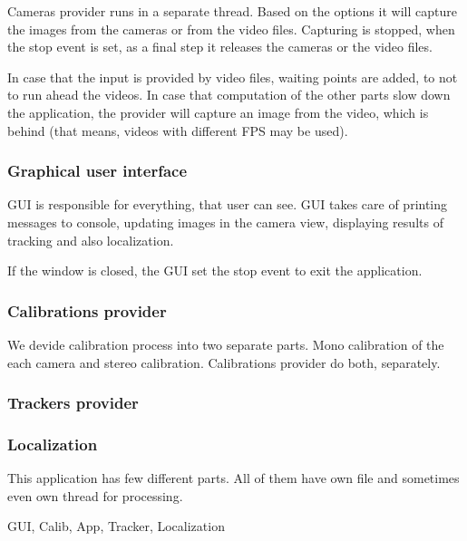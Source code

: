 Cameras provider runs in a separate thread. Based on the options it will
capture the images from the cameras or from the video files. Capturing is
stopped, when the stop event is set, as a final step it releases the cameras or
the video files.

In case that the input is provided by video files, waiting points are added, to
not to run ahead the videos. In case that computation of the other parts slow
down the application, the provider will capture an image from the video, which
is behind (that means, videos with different FPS may be used).


\subsubsection*{Graphical user interface}

GUI is responsible for everything, that user can see. GUI takes care of
printing messages to console, updating images in the camera view, displaying
results of tracking and also localization.

If the window is closed, the GUI set the stop event to exit the application.

\subsubsection*{Calibrations provider}

We devide calibration process into two separate parts. Mono calibration of the
each camera and stereo calibration. Calibrations provider do both, separately.

\subsubsection*{Trackers provider}




\subsubsection*{Localization}








This application has few different parts. All of them have own file and
sometimes even own thread for processing. 

GUI, Calib, App, Tracker, Localization

